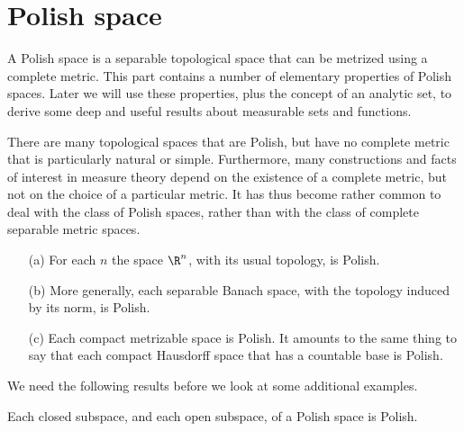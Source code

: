 \section{Polish space}
A Polish space is a separable topological space that can be metrized using a complete metric. This part contains a number of elementary properties of Polish spaces. Later we will use these properties, plus the concept of an analytic set, to derive some deep and useful results about measurable sets and functions.\par
There are many topological spaces that are Polish, but have no complete metric that is particularly natural or simple. Furthermore, many constructions and facts of interest in measure theory depend on the existence of a complete metric, but not on the choice of a particular metric. It has thus become rather common to deal with the class of Polish spaces, rather than with the class of complete separable metric spaces.
\begin{example}
\mbox{}
\begin{itemize}
\item[(a)] For each $n$ the space $\R^n$, with its usual topology, is Polish.
\item[(b)] More generally, each separable Banach space, with the topology induced by its norm, is Polish.
\item[(c)] Each compact metrizable space is Polish. It amounts to the same thing to say that each compact Hausdorff space that has a countable base is Polish. 
\end{itemize}
\end{example}
We need the following results before we look at some additional examples.
\begin{proposition}\label{Polish open closed is polish}
Each closed subspace, and each open subspace, of a Polish space is Polish.
\end{proposition}
